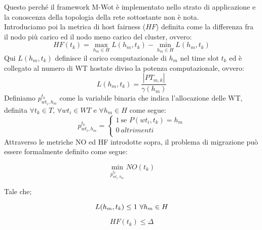 \documentclass[11pt]{article}
\begin{document}
		Questo perché il framework M-Wot è implementato nello strato di applicazione e la conoscenza della topologia della rete sottostante non è nota. \\
		Introduciamo poi la metrica di host fairness ($HF$) definita come la differenza fra il nodo più carico ed il nodo meno carico del cluster, ovvero:
		\[
			HF(t_k) = \max_{h_m \in H} L(h_m, t_k) - \min_{h_m \in H} L(h_m, t_k)
		\]
		Qui $L(h_m, t_k)$ definisce il carico computazionale di $h_m$ nel time slot $t_k$ ed è collegato al numero di WT hostate diviso la potenza computazionale, ovvero:
		\[
			L(h_m, t_k) = \frac{|PT_{m,k}|}{\gamma(h_m)}
		\]
		Definiamo $p^{t_k}_{wt_i, h_m}$ come la variabile binaria che indica l'allocazione delle WT, definita $\forall t_k \in T$, $\forall wt_i \in WT$ e $\forall h_m \in H$ come segue:
		\[
		p^{t_k}_{wt_i, h_m} =
		\begin{cases}
			1 \ \text{se } P(wt_i, t_k) = h_m\\
			0 \ \textit{altrimenti}\\
		\end{cases}
		\]
		Attraverso le metriche NO ed HF introdotte sopra, il problema di migrazione può essere formalmente definito come segue:
		
		\[
		\min_{p^{t_k}_{wt_i, h_m}} NO(t_k)
		\]
		
		Tale che;
		
		\[
			L(h_m, t_k) \le 1 \ \forall h_m \in H \\
		\]
		
		\[
						HF(t_k) \le \Delta
		\]
	
\end{document}
